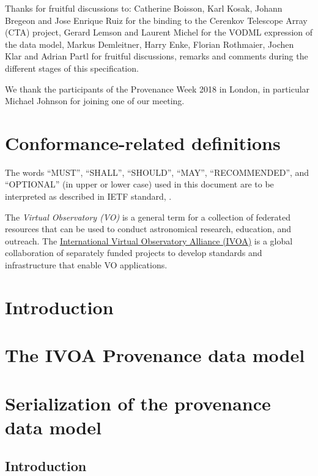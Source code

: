 \documentclass[11pt,a4paper]{ivoa}
\begin{document}
Thanks for fruitful discussions to: Catherine Boisson, Karl Kosak, Johann Bregeon and Jose Enrique Ruiz 
for the binding to the Cerenkov Telescope Array (CTA) project, Gerard
Lemson and Laurent Michel for the VODML expression of the data model, Markus Demleitner,
Harry Enke, Florian Rothmaier, Jochen Klar and Adrian Partl
for fruitful discussions, remarks and comments during the different stages of this
specification.

We thank the participants of the Provenance Week 2018 in London, in particular Michael Johnson for joining one of our meeting.

\section*{Conformance-related definitions}

The words ``MUST'', ``SHALL'', ``SHOULD'', ``MAY'', ``RECOMMENDED'', and
``OPTIONAL'' (in upper or lower case) used in this document are to be
interpreted as described in IETF standard, \citet{std:RFC2119}.

The \emph{Virtual Observatory (VO)} is
a general term for a collection of federated resources that can be used
to conduct astronomical research, education, and outreach.
The \href{http://www.ivoa.net}{International
Virtual Observatory Alliance (IVOA)} is a global
collaboration of separately funded projects to develop standards and
infrastructure that enable VO applications.

\section{Introduction}
\label{sec:intro}





\section{The IVOA Provenance data model}
\label{sec:datamodel}

\clearpage

\section{Serialization of the provenance data model}
\label{sec:serialisations}
\subsection{Introduction}
\label{sec:intro-serialization}

\end{document}
